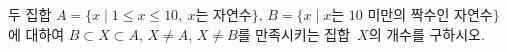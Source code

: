 두 집합 $A=\{x \mid 1\le x\le 10,\ x$는 자연수$\}$, $B=\{x \mid x$는 $10$ 미만의 짝수인 자연수$\}$에 대하여 $B\subset X\subset A$, $X\ne A$, $X\ne B$를 만족시키는 집합~$X$의 개수를 구하시오.
